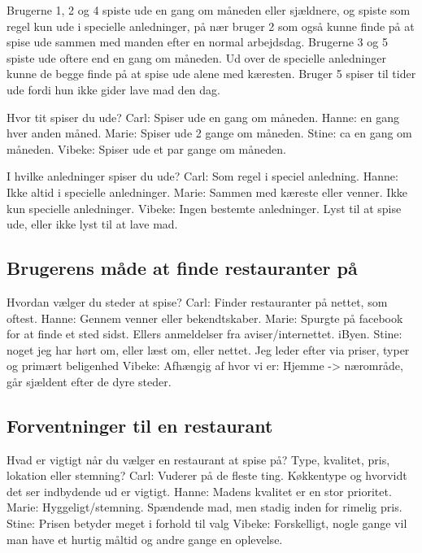 \documentclass[a4paper, 12pt]{article}
\begin{document}
Brugerne 1, 2 og 4 spiste ude en gang om måneden eller sjældnere, og spiste som regel
kun ude i specielle anledninger, på nær bruger 2 som også kunne finde på at spise ude
sammen med manden efter en normal arbejdsdag.
Brugerne 3 og 5 spiste ude oftere end en gang om måneden. Ud over de specielle anledninger
kunne de begge finde på at spise ude alene med kæresten. Bruger 5 spiser til tider ude
fordi hun ikke gider lave mad den dag.

  Hvor tit spiser du ude?
    Carl: Spiser ude en gang om måneden.
    Hanne: en gang hver anden måned.
    Marie: Spiser ude 2 gange om måneden.
    Stine: ca en gang om måneden.
    Vibeke: Spiser ude et par gange om måneden.

  I hvilke anledninger spiser du ude?
    Carl: Som regel i speciel anledning.
    Hanne: Ikke altid i specielle anledninger.
    Marie: Sammen med kæreste eller venner. Ikke kun specielle anledninger.
    Vibeke: Ingen bestemte anledninger. Lyst til at spise ude, eller ikke lyst til at lave mad.

\subsection{Brugerens måde at finde restauranter på}



  Hvordan vælger du steder at spise?
    Carl: Finder restauranter på nettet, som oftest.
    Hanne: Gennem venner eller bekendtskaber.
    Marie: Spurgte på facebook for at finde et sted sidst. Ellers anmeldelser fra aviser/internettet. iByen.
    Stine: noget jeg har hørt om, eller læst om, eller nettet. Jeg leder efter via priser, typer og primært beligenhed
    Vibeke: Afhængig af hvor vi er: Hjemme -> nærområde, går sjældent efter de dyre steder.

\subsection{Forventninger til en restaurant}

  Hvad er vigtigt når du vælger en restaurant at spise på?
  Type, kvalitet, pris, lokation eller stemning?
    Carl: Vuderer på de fleste ting. Køkkentype og hvorvidt det ser indbydende ud er vigtigt.
    Hanne: Madens kvalitet er en stor prioritet.
    Marie: Hyggeligt/stemning. Spændende mad, men stadig inden for rimelig pris.
    Stine: Prisen betyder meget i forhold til valg
    Vibeke: Forskelligt, nogle gange vil man have et hurtig måltid og andre gange en oplevelse.
\end{document}
